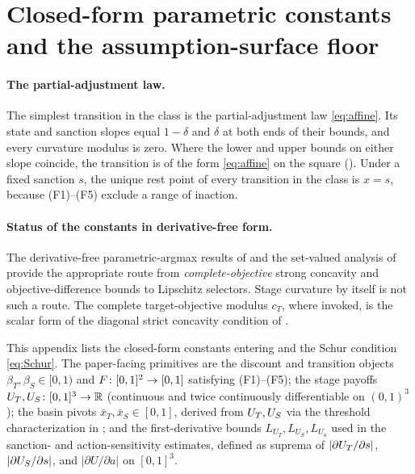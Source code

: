 \section{Closed-form parametric constants and the assumption-surface floor}
\label{app:closedforms}

\paragraph{The partial-adjustment law.} The simplest transition in the class is
the partial-adjustment law \eqref{eq:affine}.
Its state and sanction slopes equal $1-\delta$ and $\delta$ at both ends of their
bounds, and every curvature modulus is zero. Where the lower and upper bounds on
either slope coincide, the transition is of the form \eqref{eq:affine} on the
square (). Under a fixed sanction $s$, the unique rest point
of every transition in the class is $x=s$, because \textup{(F1)--(F5)} exclude a
range of inaction.

\paragraph{Status of the constants in derivative-free form.} The derivative-free
parametric-argmax results of \citet{KlatteKummer2002} and the
set-valued analysis of \citet{AubinFrankowska1990} provide the
appropriate route from \emph{complete-objective} strong concavity and
objective-difference bounds to Lipschitz selectors. Stage curvature by
itself is not such a route. The complete target-objective modulus
$c_T$, where invoked, is the scalar form of the diagonal strict
concavity condition of \citet{Rosen1965}.

This appendix lists the closed-form constants entering
 and the Schur condition
\eqref{eq:Schur}. The paper-facing primitives are the discount and
transition objects $\beta_T,\beta_S\in[0,1)$ and
$F\colon[0,1]^2\to[0,1]$ satisfying \textup{(F1)--(F5)};
the stage payoffs $U_T,U_S\colon[0,1]^3\to\mathbb{R}$ (continuous and twice
continuously differentiable on $(0,1)^3$); the basin pivots
$\bar x_T,\bar x_S\in[0,1]$, derived from $U_T,U_S$ via the
threshold characterization in ; and the
first-derivative bounds $L_{U_T},L_{U_S},L_{U_a}$ used in the
sanction- and action-sensitivity estimates, defined as suprema of
$|\partial U_T/\partial s|$, $|\partial U_S/\partial s|$, and
$|\partial U/\partial a|$ on $[0,1]^3$.

